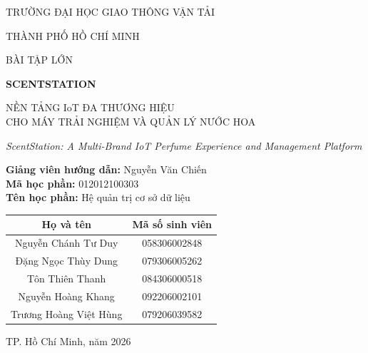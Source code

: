 \documentclass[a4paper,12pt,oneside]{report}
\begin{document}
\begin{titlepage}
\centering
\vspace*{0.8cm}
{\large TRƯỜNG ĐẠI HỌC GIAO THÔNG VẬN TẢI\par}
{\large THÀNH PHỐ HỒ CHÍ MINH\par}
\vspace{1.4cm}
{\large BÀI TẬP LỚN\par}
\vspace{0.8cm}

{\Huge\bfseries SCENTSTATION\par}
\vspace{0.5cm}
{\Large NỀN TẢNG IoT ĐA THƯƠNG HIỆU\\
CHO MÁY TRẢI NGHIỆM VÀ QUẢN LÝ NƯỚC HOA\par}
\vspace{0.5cm}
{\large\itshape ScentStation: A Multi-Brand IoT Perfume Experience and Management Platform\par}
\vspace{1.5cm}

\vspace{0.8cm}

\begin{flushright}
    \textbf{Giảng viên hướng dẫn:} Nguyễn Văn Chiến\\
    \textbf{Mã học phần:} 012012100303\\
    \textbf{Tên học phần:} Hệ quản trị cơ sở dữ liệu
\end{flushright}

\vspace{0.5cm}

\vspace{1cm}

\begin{center}
\begin{tabular}{|c|c|}
    \hline
    \textbf{Họ và tên} & \textbf{Mã số sinh viên} \\
    \hline
    Nguyễn Chánh Tư Duy & 058306002848 \\
    \hline
    Đặng Ngọc Thùy Dung & 079306005262 \\
    \hline
    Tôn Thiên Thanh & 084306000518 \\
    \hline
    Nguyễn Hoàng Khang & 092206002101 \\
    \hline
    Trương Hoàng Việt Hùng & 079206039582 \\
    \hline
\end{tabular}
\end{center}
\vfill

\begin{center}
    {\large TP. Hồ Chí Minh, năm 2026\par}
\end{center}

\end{titlepage}

\clearpage

\clearpage
\tableofcontents
\clearpage
\end{document}
